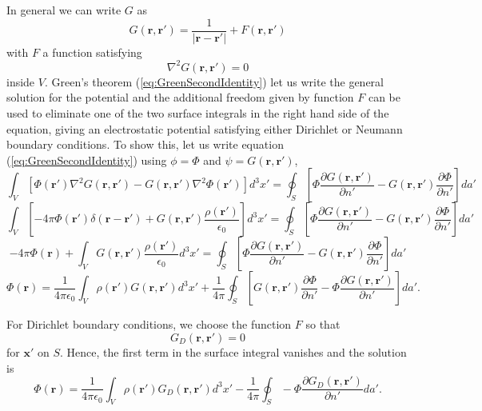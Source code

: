 In general we can write $G$ as
\begin{equation}
G(\textbf{r}, \textbf{r}') = \frac{1}{\left| \textbf{r} - \textbf{r}' \right|} + F(\textbf{r}, \textbf{r}')
\end{equation}
with $F$ a function satisfying 
\begin{equation}
\nabla^2 G(\textbf{r}, \textbf{r}') = 0
\end{equation}
inside $V$. Green's theorem (\ref{eq:GreenSecondIdentity}) let us write the general solution for the potential and the additional freedom given by function $F$ can be used to eliminate one of the two surface integrals in the right hand side of the equation, giving an electrostatic  potential satisfying either Dirichlet or Neumann boundary conditions. To show this, let us write equation (\ref{eq:GreenSecondIdentity}) using $\phi = \Phi$ and $\psi = G(\textbf{r}, \textbf{r}')$,
\begin{equation}
\int_V \left[ \Phi (\textbf{r}') \nabla^2 G(\textbf{r}, \textbf{r}') - G(\textbf{r}, \textbf{r}') \nabla^2 \Phi (\textbf{r}')  \right] d^3x' = \oint_S \left[ \Phi \frac{\partial G(\textbf{r}, \textbf{r}')}{\partial n'} - G(\textbf{r}, \textbf{r}') \frac{\partial \Phi}{\partial n'} \right] da'
\end{equation}
\begin{equation}
\int_V \left[ -4 \pi \Phi (\textbf{r}') \delta (\textbf{r} - \textbf{r}') + G(\textbf{r}, \textbf{r}') \frac{\rho (\textbf{r}')}{\epsilon_0}   \right] d^3x' = \oint_S \left[ \Phi \frac{\partial G(\textbf{r}, \textbf{r}')}{\partial n'} - G(\textbf{r}, \textbf{r}') \frac{\partial \Phi}{\partial n'} \right] da'
\end{equation}
\begin{equation}
 -4 \pi \Phi (\textbf{r}) + \int_V G(\textbf{r}, \textbf{r}') \frac{\rho (\textbf{r}')}{\epsilon_0}  d^3x' = \oint_S \left[ \Phi \frac{\partial G(\textbf{r}, \textbf{r}')}{\partial n'} - G(\textbf{r}, \textbf{r}') \frac{\partial \Phi}{\partial n'} \right] da'
\end{equation}
\begin{equation}
 \Phi (\textbf{r}) = \frac{1}{4 \pi  \epsilon_0} \int_V \rho (\textbf{r}') G(\textbf{r}, \textbf{r}')   d^3x' +\frac{1}{4\pi} \oint_S \left[ G(\textbf{r}, \textbf{r}') \frac{\partial \Phi}{\partial n'} - \Phi \frac{\partial G(\textbf{r}, \textbf{r}')}{\partial n'}  \right] da'. 
\end{equation}

For Dirichlet boundary conditions, we choose the function $F$ so that
\begin{equation}
G_D (\textbf{r}, \textbf{r}') = 0 
\end{equation}
for $\textbf{x}'$ on $S$. Hence, the first term in the surface integral vanishes and the solution is 
\begin{equation}
 \Phi (\textbf{r}) = \frac{1}{4 \pi  \epsilon_0} \int_V \rho (\textbf{r}') G_D (\textbf{r}, \textbf{r}')  d^3x' -\frac{1}{4\pi} \oint_S  - \Phi \frac{\partial G _D (\textbf{r}, \textbf{r}')}{\partial n'}  da'. 
\end{equation}

